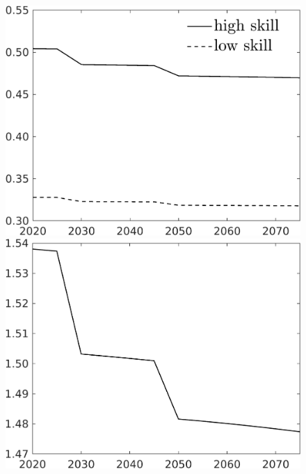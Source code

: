 \begin{figure}[h!!]
\begin{minipage}[]{0.32\textwidth}
		\includegraphics[width=1\textwidth]{../../codding_model/own_basedOnFried/optimalPol_elastS_DisuSci/figures/all_1705/SingleJointTOT_OPT_T_NoTaus_labour_spillover0_sep1_BN0_ineq0_red0_etaa0.79_lgd1.png}
	\end{minipage}
	\begin{minipage}[]{0.32\textwidth}
		\includegraphics[width=1\textwidth]{../../codding_model/own_basedOnFried/optimalPol_elastS_DisuSci/figures/all_1705/Single_OPT_T_NoTaus_hhhl_spillover0_sep1_BN0_ineq0_red0_etaa0.79.png}
	\end{minipage}

\end{figure}
